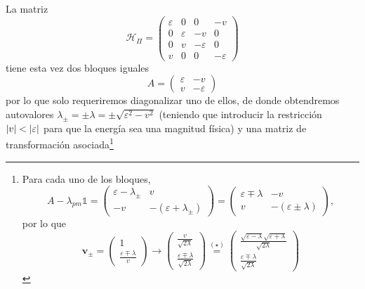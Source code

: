 \documentclass{scrartcl}
\renewcommand{\vb}[1]{\bm{#1}}
\DeclareRobustCommand{\[}{\begin{equation}}
\DeclareRobustCommand{\]}{\end{equation}}
\begin{document}
\begin{enumerate}
\begin{enumerate}
\begin{enumerate}[(i)]
            La matriz
            \[ \mathcal{H}_\Pi = \begin{pmatrix} \varepsilon & 0 & 0 & -v \\ 0 & \varepsilon & -v & 0 \\ 0 & v & -\varepsilon & 0 \\ v & 0 & 0 & -\varepsilon \end{pmatrix} \]
            tiene esta vez dos bloques iguales
            \[ A = \begin{pmatrix} \varepsilon & -v \\ v & -\varepsilon \end{pmatrix} \]
            por lo que solo requeriremos diagonalizar uno de ellos, de donde obtendremos autovalores $\lambda_\pm = \pm \lambda = \pm \sqrt{\varepsilon^2 - v^2}$ (teniendo que introducir la restricción $\abs{v} < \abs{\varepsilon}$ para que la energía sea una magnitud física) y una matriz de transformación asociada\footnote{
                Para cada uno de los bloques,
                \[ A - \lambda_{pm} \mathds{1} = \begin{pmatrix} \varepsilon - \lambda_\pm & v \\ -v & -(\varepsilon + \lambda_\pm) \end{pmatrix} = \begin{pmatrix} \varepsilon \mp \lambda & -v \\ v & -(\varepsilon \pm \lambda) \end{pmatrix}, \]
                por lo que
                \[ \vb{v}_\pm = \begin{pmatrix} 1 \\ \frac{\varepsilon \mp \lambda}{v} \end{pmatrix} \longrightarrow \begin{pmatrix} \frac{v}{\sqrt{2\lambda}} \\ \frac{\varepsilon \mp \lambda}{\sqrt{2\lambda}} \end{pmatrix} \mathrel{\stackrel{(\star)}{=}} \begin{pmatrix} \frac{\sqrt{\varepsilon - \lambda} \sqrt{\varepsilon + \lambda}}{\sqrt{2\lambda}} \\ \frac{\varepsilon \mp \lambda}{\sqrt{2\lambda}} \end{pmatrix} \]
}
\end{enumerate}
\end{enumerate}
\end{enumerate}
\end{document}
